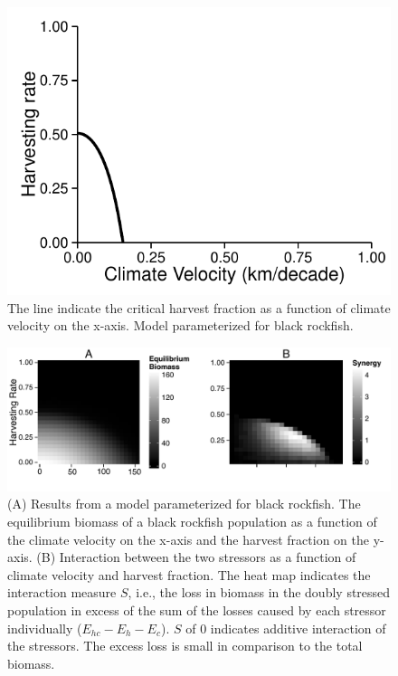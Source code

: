 \documentclass[12pt,english]{article}
\begin{document}
\begin{figure}[h]
\centering
\includegraphics[width=.45\textwidth]{../../../plots/rockfish_criticalh.pdf}
\caption{ \label{crith_rockfish}
The line indicate the critical harvest fraction as a function of climate velocity on the x-axis. Model parameterized for black rockfish. }
 \end{figure}
 
  \begin{figure}[h]
 \centering
 \includegraphics[width=.75\textwidth]{../../../plots/rockfisheqbiomass.pdf}
 \caption{ \label{synergy_rockfish}
 (A) Results from a model parameterized for black rockfish. The equilibrium biomass of a black rockfish population as a function of the climate velocity on the x-axis and the harvest fraction on the y-axis. (B) Interaction between the two stressors as a function of climate velocity and harvest fraction. The heat map indicates the interaction measure $S$, i.e., the loss in biomass in the doubly stressed population in excess of the sum of the losses caused by each stressor individually ($E_{hc}-E_h-E_c$). $S$ of $0$ indicates additive interaction of the stressors. The excess loss is small in comparison to the total biomass.
 }
 \end{figure}
\end{document}
